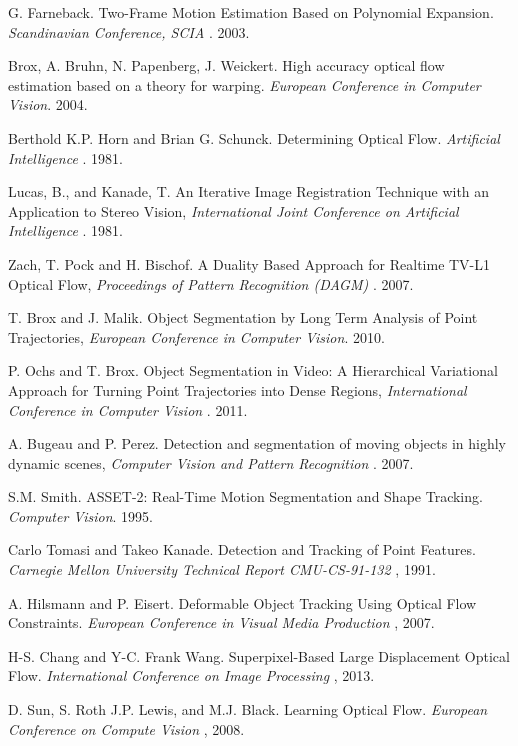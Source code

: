 \begin{thebibliography}{99}
G. Farneback. Two-Frame Motion Estimation Based on Polynomial Expansion. {\it Scandinavian Conference, SCIA }. 2003.

Brox, A. Bruhn, N. Papenberg, J. Weickert. High accuracy optical flow estimation based on a theory for warping. {\it European Conference in Computer Vision}. 2004.

Berthold K.P. Horn and Brian G. Schunck. Determining Optical Flow. {\it Artificial Intelligence }. 1981.

Lucas, B., and Kanade, T. An Iterative Image Registration Technique with an Application to Stereo Vision, {\it International Joint Conference on Artificial Intelligence }. 1981.

Zach, T. Pock and H. Bischof. A Duality Based Approach for Realtime TV-L1 Optical Flow, {\it Proceedings of Pattern Recognition (DAGM) }. 2007.

T. Brox and J. Malik. Object Segmentation by Long Term Analysis of Point Trajectories, {\it European Conference in Computer Vision}. 2010.

P. Ochs and T. Brox. Object Segmentation in Video: A Hierarchical Variational Approach for Turning Point Trajectories into Dense Regions, {\it International Conference in Computer Vision }. 2011.

A. Bugeau and P. Perez. Detection and segmentation of moving objects in highly dynamic scenes, {\it Computer Vision and Pattern Recognition }. 2007.

S.M. Smith. ASSET-2: Real-Time Motion Segmentation and Shape Tracking. {\it Computer Vision}. 1995. 

Carlo Tomasi and Takeo Kanade. Detection and Tracking of Point Features. {\it Carnegie Mellon University Technical Report CMU-CS-91-132 }, 1991.

A. Hilsmann and P. Eisert. Deformable Object Tracking Using Optical Flow Constraints. {\it European Conference in Visual Media Production }, 2007.

H-S. Chang and Y-C. Frank Wang. Superpixel-Based Large Displacement Optical Flow. {\it International Conference on Image Processing }, 2013.

D. Sun, S. Roth J.P. Lewis, and M.J. Black. Learning Optical Flow. {\it European Conference on Compute Vision }, 2008.

\end{thebibliography}
